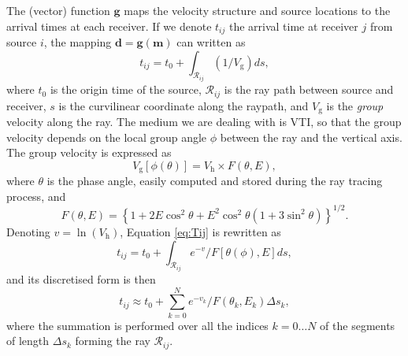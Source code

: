 \documentclass{article}
\renewcommand\vec[1]{\mathbf{#1}}
\begin{document}
The (vector) function $\vec{g}$ maps the velocity structure and source locations to the arrival times at each receiver. If we denote $t_{ij}$ the arrival time at receiver $j$ from source $i$, the mapping $\vec{d}=\vec{g}(\vec{m})$ can written as
\begin{equation} \label{eq:Tij}
t_{ij} = t_0 + \int_{\mathcal{R}_{ij}}(1/V_\mathrm{g})ds,
\end{equation}
where $t_0$ is the origin time of the source, $\mathcal{R}_{ij}$ is the ray path between source and receiver, $s$ is the curvilinear coordinate along the raypath, and $V_\mathrm{g}$ is the \emph{group} velocity along the ray. The medium we are dealing with is VTI, so that the group velocity depends on the local group angle $\phi$ between the ray and the vertical axis. The group velocity is expressed as
\begin{equation}
  V_\mathrm{g}[\phi(\theta)] = V_\mathrm{h}\times F(\theta,E),
\end{equation}
where $\theta$ is the phase angle, easily computed and stored during the ray tracing process, and
\begin{equation}
  F(\theta,E) = \left\{ 1 + 2E\cos^2\theta +E^2\cos^2\theta\left( 1 + 3\sin^2\theta\right)\right\}^{1/2}.
\end{equation}
Denoting $v=\ln(V_\mathrm{h})$, Equation \ref{eq:Tij} is rewritten as
\begin{equation}
  t_{ij} = t_0 + \int_{\mathcal{R}_{ij}} e^{-v}/F[\theta(\phi),E]ds,
\end{equation}
and its discretised form is then
\begin{equation}
  t_{ij} \approx t_0 + \sum_{k=0}^N e^{-v_k}/F(\theta_k, E_k)\Delta s_k,
\end{equation}
where the summation is performed over all the indices $k=0\ldots N$ of the segments of length $\Delta s_k$ forming the ray $\mathcal{R}_{ij}$.
\end{document}
